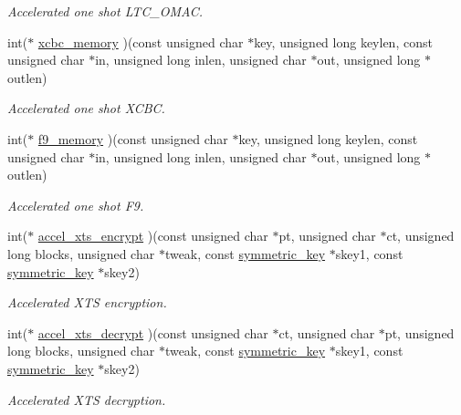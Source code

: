 \begin{DoxyCompactItemize}
\begin{DoxyCompactList}\small\item\em Accelerated one shot L\+T\+C\+\_\+\+O\+M\+AC. \end{DoxyCompactList}\item 
int($\ast$ \mbox{\hyperlink{structltc__cipher__descriptor_aa4cd54490d5900e4e49580fecff8c318}{xcbc\+\_\+memory}} )(const unsigned char $\ast$key, unsigned long keylen, const unsigned char $\ast$in, unsigned long inlen, unsigned char $\ast$out, unsigned long $\ast$outlen)
\begin{DoxyCompactList}\small\item\em Accelerated one shot X\+C\+BC. \end{DoxyCompactList}\item 
int($\ast$ \mbox{\hyperlink{structltc__cipher__descriptor_af91aa424236f8db34e0396aeb28d7d3b}{f9\+\_\+memory}} )(const unsigned char $\ast$key, unsigned long keylen, const unsigned char $\ast$in, unsigned long inlen, unsigned char $\ast$out, unsigned long $\ast$outlen)
\begin{DoxyCompactList}\small\item\em Accelerated one shot F9. \end{DoxyCompactList}\item 
int($\ast$ \mbox{\hyperlink{structltc__cipher__descriptor_a1a0a384c38a8ba920d50cd43d0f016a6}{accel\+\_\+xts\+\_\+encrypt}} )(const unsigned char $\ast$pt, unsigned char $\ast$ct, unsigned long blocks, unsigned char $\ast$tweak, const \mbox{\hyperlink{tomcrypt__cipher_8h_ac5a146550efe94c415d95abc7e454362}{symmetric\+\_\+key}} $\ast$skey1, const \mbox{\hyperlink{tomcrypt__cipher_8h_ac5a146550efe94c415d95abc7e454362}{symmetric\+\_\+key}} $\ast$skey2)
\begin{DoxyCompactList}\small\item\em Accelerated X\+TS encryption. \end{DoxyCompactList}\item 
int($\ast$ \mbox{\hyperlink{structltc__cipher__descriptor_afc98a5dedcb756fb765403942728b2d4}{accel\+\_\+xts\+\_\+decrypt}} )(const unsigned char $\ast$ct, unsigned char $\ast$pt, unsigned long blocks, unsigned char $\ast$tweak, const \mbox{\hyperlink{tomcrypt__cipher_8h_ac5a146550efe94c415d95abc7e454362}{symmetric\+\_\+key}} $\ast$skey1, const \mbox{\hyperlink{tomcrypt__cipher_8h_ac5a146550efe94c415d95abc7e454362}{symmetric\+\_\+key}} $\ast$skey2)
\begin{DoxyCompactList}\small\item\em Accelerated X\+TS decryption. \end{DoxyCompactList}\end{DoxyCompactItemize}


